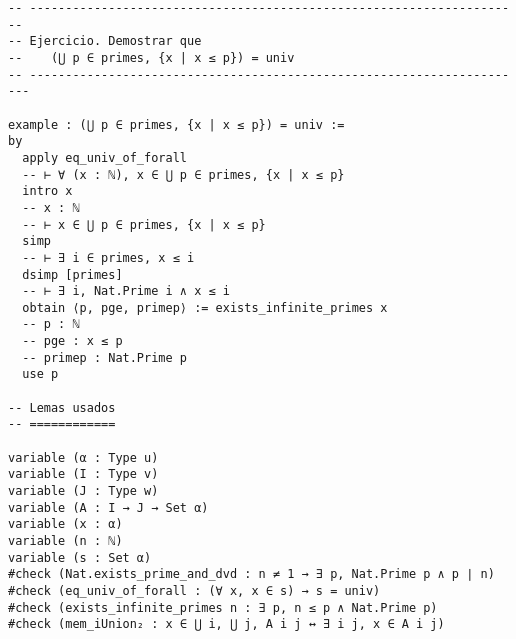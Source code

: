 \begin{verbatim}
-- ---------------------------------------------------------------------
-- Ejercicio. Demostrar que
--    (⋃ p ∈ primes, {x | x ≤ p}) = univ
-- ----------------------------------------------------------------------

example : (⋃ p ∈ primes, {x | x ≤ p}) = univ :=
by
  apply eq_univ_of_forall
  -- ⊢ ∀ (x : ℕ), x ∈ ⋃ p ∈ primes, {x | x ≤ p}
  intro x
  -- x : ℕ
  -- ⊢ x ∈ ⋃ p ∈ primes, {x | x ≤ p}
  simp
  -- ⊢ ∃ i ∈ primes, x ≤ i
  dsimp [primes]
  -- ⊢ ∃ i, Nat.Prime i ∧ x ≤ i
  obtain ⟨p, pge, primep⟩ := exists_infinite_primes x
  -- p : ℕ
  -- pge : x ≤ p
  -- primep : Nat.Prime p
  use p

-- Lemas usados
-- ============

variable (α : Type u)
variable (I : Type v)
variable (J : Type w)
variable (A : I → J → Set α)
variable (x : α)
variable (n : ℕ)
variable (s : Set α)
#check (Nat.exists_prime_and_dvd : n ≠ 1 → ∃ p, Nat.Prime p ∧ p ∣ n)
#check (eq_univ_of_forall : (∀ x, x ∈ s) → s = univ)
#check (exists_infinite_primes n : ∃ p, n ≤ p ∧ Nat.Prime p)
#check (mem_iUnion₂ : x ∈ ⋃ i, ⋃ j, A i j ↔ ∃ i j, x ∈ A i j)
\end{verbatim}

